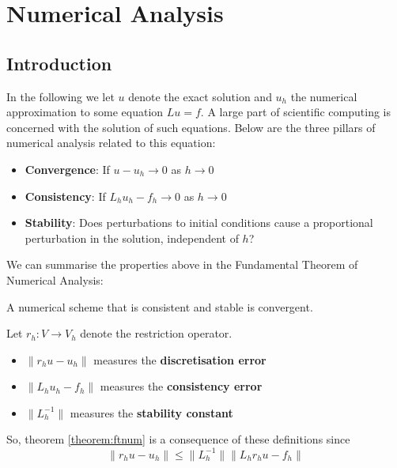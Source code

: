 \chapter{Numerical Analysis}\label{chapter:numerical_analysis}
\localtableofcontents

\section{Introduction}

In the following we let $u$ denote the exact solution and $u_h$ the numerical approximation to some equation $L u = f$. A large part of scientific computing is
concerned with the solution of such equations. Below are the three pillars of numerical analysis related to this equation:
\begin{itemize}
\item \textbf{Convergence}: If $u - u_h \rightarrow 0$ as $h\rightarrow 0$
\item \textbf{Consistency}: If $L_h u_h - f_h \rightarrow 0$ as $h\rightarrow 0$
\item \textbf{Stability}: Does perturbations to initial conditions cause a 
    proportional perturbation in the solution, independent of $h$?
\end{itemize}

We can summarise the properties above in the Fundamental Theorem of Numerical Analysis:
\begin{theorem}\label{theorem:ftnum}
A numerical scheme that is consistent and stable is convergent.
\end{theorem}

Let $r_h : V \rightarrow V_h$ denote the restriction operator.

\begin{itemize}
\item $\| r_h u - u_h \|$ measures the \textbf{discretisation error}
\item $\| L_h u_h - f_h \|$ measures the \textbf{consistency error}
\item $\| L_h^{-1}\|$ measures the \textbf{stability constant}
\end{itemize}

So, theorem \ref{theorem:ftnum} is a consequence of these definitions since
\[
\| r_h u - u_h \|\leq \| L_h^{-1}\|\| L_h r_h u - f_h \|
\]

